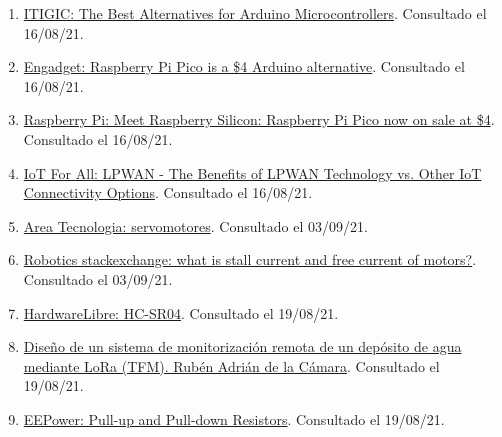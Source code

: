\documentclass[12pt]{article}
\begin{document}
\begin{enumerate}
			\item 
			\label{bib: alternative to arduino}
			\href{https://itigic.com/best-alternatives-for-arduino-microcontrollers/}{ITIGIC: The Best Alternatives for Arduino Microcontrollers}. Consultado el 16/08/21.
			
			\item 
			\label{bib: raspberry pi pico}
			\href{https://www.engadget.com/raspberry-pi-pico-microcontroller-154235348.html?guccounter=1}{Engadget: Raspberry Pi Pico is a \$4 Arduino alternative}. Consultado el 16/08/21.
			
			\item 
			\label{bib: raspberry pi pico 2}
			\href{https://www.raspberrypi.org/blog/raspberry-pi-silicon-pico-now-on-sale/}{Raspberry Pi: Meet Raspberry Silicon: Raspberry Pi Pico now on sale at \$4}. Consultado el 16/08/21.
			
			\item 
			\label{bib: iotforall lpwan options}
			\href{https://www.iotforall.com/lpwan-benefits-vs-iot-connectivity-options}{IoT For All: LPWAN - The Benefits of LPWAN Technology vs. Other IoT Connectivity Options}. Consultado el 16/08/21.
			
			\item
			\label{areatecnologia: servomotores}
			\href{https://www.areatecnologia.com/electricidad/servomotor.html}{Area Tecnologia: servomotores}. Consultado el 03/09/21.
			
			\item
			\label{robotics stall and free current}
			\href{https://robotics.stackexchange.com/questions/613/wha; t-is-stall-current-and-free-current-of-motors}{Robotics stackexchange: what is stall current and free current of motors?}. Consultado el 03/09/21.
			
			\item
			\label{hwlibre hc-sr04}
			\href{https://www.hwlibre.com/hc-sr04/}{HardwareLibre: HC-SR04}. Consultado el 19/08/21.	
			
			\item 
			\label{TFM LoRa}
			\href{http://openaccess.uoc.edu/webapps/o2/bitstream/10609/97127/8/radriandTFM0619memoria.pdf}{Diseño de un sistema de monitorización remota de un depósito de agua mediante LoRa (TFM). Rubén Adrián de la Cámara}. Consultado el 19/08/21.
			
			\item 
			\label{bib: eepower pull up pull down resistors}
			\href{https://eepower.com/resistor-guide/resistor-applications/pull-up-resistor-pull-down-resistor/#}{EEPower: Pull-up and Pull-down Resistors}. Consultado el 19/08/21.	
			

\end{enumerate}
\end{document}
